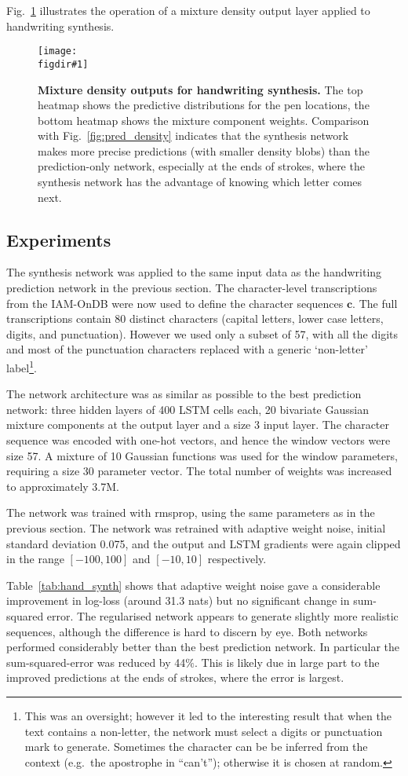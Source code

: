 \documentclass{article}
\newcommand{\eg}{e.g.\ }
\newcommand{\flabel}[1]{\label{fig:#1}}
\newcommand{\fref}[1]{Fig.~\ref{fig:#1}}
\newcommand{\tref}[1]{Table~\ref{tab:#1}}
\newcommand{\seq}[1]{\mathbf{#1}}
\newcommand{\ann}{\seq{c}}
\newcommand{\figdir}{}
\newcommand{\capt}[2]{\caption[#1]{\textbf{#1}#2}}
\newcommand{\fig}[5]
{
\begin{figure}
\begin{center}
\texttt{[image: \\figdir\#1]}
\end{center}
\capt{#4}{#5}
\flabel{#2}
\end{figure}
}
\begin{document}
\fref{synth_density} illustrates the operation of a mixture density output layer applied to handwriting synthesis.

\fig{synth_density}{synth_density}{1}{Mixture density outputs for handwriting synthesis.}{ The top heatmap shows the predictive distributions for the pen locations, the bottom heatmap shows the mixture component weights. Comparison with \fref{pred_density} indicates that the synthesis network makes more precise predictions (with smaller density blobs) than the prediction-only network, especially at the ends of strokes, where the synthesis network has the advantage of knowing which letter comes next.}

\subsection{Experiments}
The synthesis network was applied to the same input data as the handwriting prediction network in the previous section.
The character-level transcriptions from the IAM-OnDB were now used to define the character sequences $\ann$.
The full transcriptions contain 80 distinct characters (capital letters, lower case letters, digits, and punctuation). 
However we used only a subset of 57, with all the digits and most of the punctuation characters replaced with a generic `non-letter' label\footnote{This was an oversight; however it led to the interesting result that when the text contains a non-letter, the network must select a digits or punctuation mark to generate. Sometimes the character can be be inferred from the context (\eg the apostrophe in ``can't''); otherwise it is chosen at random.}.

The network architecture was as similar as possible to the best prediction network: three hidden layers of 400 LSTM cells each, 20 bivariate Gaussian mixture components at the output layer and a size 3 input layer.
The character sequence was encoded with one-hot vectors, and hence the window vectors were size 57.
A mixture of 10 Gaussian functions was used for the window parameters, requiring a size 30 parameter vector.
The total number of weights was increased to approximately 3.7M.

The network was trained with rmsprop, using the same parameters as in the previous section.
The network was retrained with adaptive weight noise, initial standard deviation 0.075, and the output and LSTM gradients were again clipped in the range $[-100,100]$ and $[-10,10]$ respectively.

\tref{hand_synth} shows that adaptive weight noise gave a considerable improvement in log-loss (around 31.3 nats) but no significant change in sum-squared error.
The regularised network appears to generate slightly more realistic sequences, although the difference is hard to discern by eye.
Both networks performed considerably better than the best prediction network.
In particular the sum-squared-error was reduced by 44$\%$.
This is likely due in large part to the improved predictions at the ends of strokes, where the error is largest.
\end{document}
